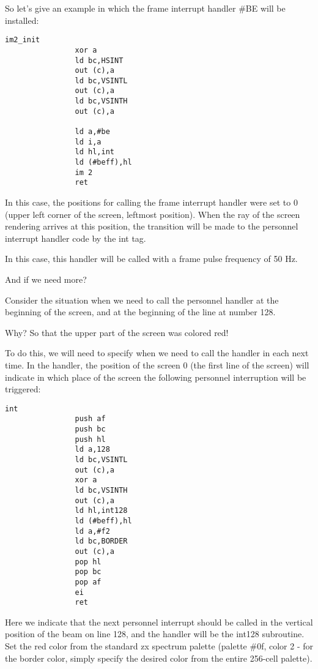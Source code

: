 So let's give an example in which the frame interrupt handler \#BE will
be installed:
\begin{verbatim}
im2_init
                xor a
                ld bc,HSINT
                out (c),a
                ld bc,VSINTL
                out (c),a
                ld bc,VSINTH
                out (c),a

                ld a,#be
                ld i,a
                ld hl,int
                ld (#beff),hl
                im 2
                ret
\end{verbatim}
In this case, the positions for calling the frame interrupt handler
were set to 0 (upper left corner of the screen, leftmost position).
When the ray of the screen rendering arrives at this position, the
transition will be made to the personnel interrupt handler code by the
int tag.

In this case, this handler will be called with a frame pulse frequency
of 50 Hz.

And if we need more?

Consider the situation when we need to call the personnel handler at
the beginning of the screen, and at the beginning of the line at
number 128.

Why? So that the upper part of the screen was colored red!

To do this, we will need to specify when we need to call the handler
in each next time. In the handler, the position of the screen 0 (the
first line of the screen) will indicate in which place of the screen
the following personnel interruption will be triggered:
\begin{verbatim}
int
                push af
                push bc
                push hl
                ld a,128
                ld bc,VSINTL
                out (c),a
                xor a
                ld bc,VSINTH
                out (c),a
                ld hl,int128
                ld (#beff),hl
                ld a,#f2
                ld bc,BORDER
                out (c),a
                pop hl
                pop bc
                pop af
                ei
                ret
\end{verbatim}
Here we indicate that the next personnel interrupt should be called in
the vertical position of the beam on line 128, and the handler will be
the int128 subroutine. Set the red color from the standard zx spectrum
palette (palette \#0f, color 2 - for the border color, simply specify
the desired color from the entire 256-cell palette).

